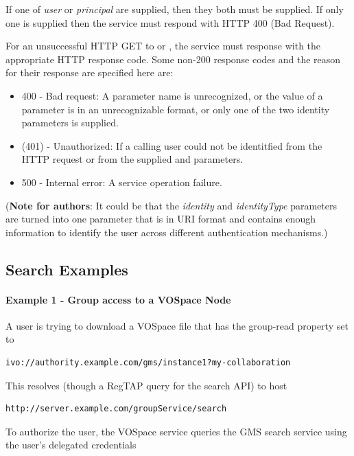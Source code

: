 \documentclass[11pt,a4paper]{ivoa}
\begin{document}
If one of \emph{user} or \emph{principal} are supplied, then they both must be supplied.  If only one is supplied then the service must respond with HTTP 400 (Bad Request).

For an unsuccessful HTTP GET to  or , the service must response with the appropriate HTTP response code.  Some non-200 response codes and the reason for their response are specified here are:

\begin{itemize}
\item{400} - Bad request:  A parameter name is unrecognized, or the value of a parameter is in an unrecognizable format, or only one of the two identity parameters is supplied.
\item(401) - Unauthorized:  If a calling user could not be identitfied from the HTTP request or from the supplied  and  parameters.
\item{500} - Internal error:  A service operation failure.
\end{itemize}

(\textbf{Note for authors}: It could be that the \emph{identity} and \emph{identityType} parameters are turned into one parameter that is in URI format and contains enough information to identify the user across different authentication mechanisms.)

\subsection {Search Examples}

\paragraph{Example 1 - Group access to a VOSpace Node}

A user is trying to download a VOSpace file that has the group-read property set to

\begin{verbatim}
ivo://authority.example.com/gms/instance1?my-collaboration
\end{verbatim}

This resolves (though a RegTAP query for the search API) to host

\begin{verbatim}
http://server.example.com/groupService/search
\end{verbatim}

To authorize the user, the VOSpace service queries the GMS search service using the user's delegated credentials
\end{document}
